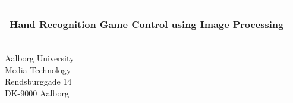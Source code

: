 %
\begin{titlepage}
  \addtolength{\hoffset}{0.5\evensidemargin-0.5\oddsidemargin} %
  \noindent%
  \begin{tabular}{@{}p{\textwidth}@{}}
    \toprule[2pt]
    \midrule
    \vspace{0.2cm}
    \begin{center}
    \Huge{\textbf{
      Hand Recognition Game Control using Image Processing%
    }}
    \end{center}
    \vspace{0.2cm}\\
    \midrule
    \toprule[2pt]
  \end{tabular}
  \vspace{1 cm}

  

  \begin{center}
  Aalborg University\\
  Media Technology\\
  Rendsburggade 14\\
  DK-9000 Aalborg
  \end{center}
\end{titlepage}
\clearpage
